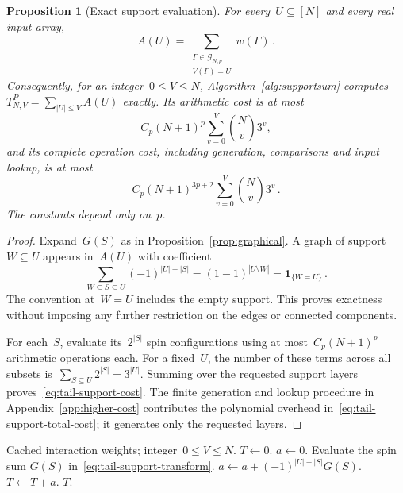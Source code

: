 \documentclass[10pt]{article}
\theoremstyle{plain}
\newtheorem{proposition}[theorem]{Proposition}
\theoremstyle{definition}
\theoremstyle{remark}
\begin{document}
\begin{proposition}[Exact support evaluation]\label{prop:tail-support-evaluation}
For every~$U\subseteq[N]$ and every real input array,
\begin{equation}\label{eq:tail-exact-support}
 A(U)=\sum_{\substack{\Gamma\in\mathcal G_{N,p}\\V(\Gamma)=U}}w(\Gamma)\,.
\end{equation}
Consequently, for an integer~$0\le V\le N$, Algorithm~\ref{alg:supportsum} computes~$T^P_{N,V}=\sum_{|U|\le V}A(U)$ exactly. Its arithmetic cost is at most
\begin{equation}\label{eq:tail-support-cost}
 C_p(N+1)^p\sum_{v=0}^{V}\binom Nv3^v,
\end{equation}
and its complete operation cost, including generation, comparisons and input lookup, is at most
\begin{equation}\label{eq:tail-support-total-cost}
 C_p(N+1)^{3p+2}\sum_{v=0}^{V}\binom Nv3^v\,.
\end{equation}
The constants depend only on~$p$.
\end{proposition}
\begin{proof}
Expand~$G(S)$ as in Proposition~\ref{prop:graphical}. A graph of support~$W\subseteq U$ appears in~$A(U)$ with coefficient
\begin{equation*}
 \sum_{W\subseteq S\subseteq U}(-1)^{|U|-|S|}
 =(1-1)^{|U\setminus W|}=\mathbf1_{\{W=U\}}\,.
\end{equation*}
The convention at~$W=U$ includes the empty support. This proves exactness without imposing any further restriction on the edges or connected components.

For each~$S$, evaluate its~$2^{|S|}$ spin configurations using at most~$C_p(N+1)^p$ arithmetic operations each. For a fixed~$U$, the number of these terms across all subsets is~$\sum_{S\subseteq U}2^{|S|}=3^{|U|}$. Summing over the requested support layers proves~\eqref{eq:tail-support-cost}. The finite generation and lookup procedure in Appendix~\ref{app:higher-cost} contributes the polynomial overhead in~\eqref{eq:tail-support-total-cost}; it generates only the requested layers.
\end{proof}

\begin{algorithm}[htbp]
\caption{\textsc{SupportSum}$(N,p,w,V)$}\label{alg:supportsum}
\begin{algorithmic}[1]
\Require Cached interaction weights; integer~$0\le V\le N$.
\State $T\gets0$.
  \State $a\gets0$.
   \State Evaluate the spin sum $G(S)$ in~\eqref{eq:tail-support-transform}.
   \State $a\gets a+(-1)^{|U|-|S|}G(S)$.
  \EndFor
  \State $T\gets T+a$.
 \EndFor
\EndFor
\State \Return $T$.
\end{algorithmic}
\end{algorithm}
\end{document}
